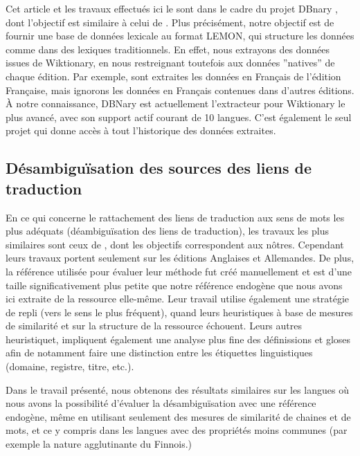 \documentclass[10pt,a4paper,twoside]{article}
\begin{document}
Cet article et les travaux effectués ici le sont dans le cadre du projet DBnary \cite{serasset:dbnary-swj}, dont l'objectif est similaire à celui de \cite{HellmannSebastianandBrekleJonasandAuer}. Plus précisément, notre objectif est de fournir une base de données lexicale au format LEMON, qui structure les données comme dans des lexiques traditionnels. En effet, nous extrayons des données issues de Wiktionary, en nous restreignant toutefois aux données ''natives'' de chaque édition. Par exemple, sont extraites les données en Français de l'édition Française, mais ignorons les données en Français contenues dans d'autres éditions.
À notre connaissance, DBNary est actuellement l'extracteur pour Wiktionary le plus avancé, avec son support actif courant de 10 langues. C'est également le seul projet qui donne accès à tout l'historique des données extraites. 

\subsection{Désambiguïsation des sources des liens de traduction} 

En ce qui concerne le rattachement des liens de traduction aux sens de mots les plus adéquats (déambiguïsation des liens de traduction), les travaux les plus similaires sont ceux de \cite{meyer-gurevych:2012:PAPERS}, dont les objectifs correspondent aux nôtres. Cependant leurs travaux portent seulement sur les éditions Anglaises et Allemandes. De plus, la référence utilisée pour évaluer leur méthode fut créé manuellement et est d'une taille significativement plus petite que notre référence endogène que nous avons ici extraite de la ressource elle-même.  Leur travail utilise également une stratégie de repli (vers le sens le plus fréquent), quand leurs heuristiques à base de mesures de similarité et sur la structure de la ressource échouent.  Leurs autres heuristiquet, impliquent également une analyse plus fine des définissions et gloses afin de notamment faire une distinction entre les étiquettes  linguistiques (domaine, registre, titre, etc.).

Dans le travail présenté, nous obtenons des résultats similaires sur les langues où nous avons la possibilité d'évaluer la désambiguïsation avec une référence endogène, même en utilisant seulement des mesures de similarité de chaines et de mots, et ce y compris dans les langues avec des propriétés moins communes (par exemple la nature agglutinante du Finnois.)  
\end{document}
